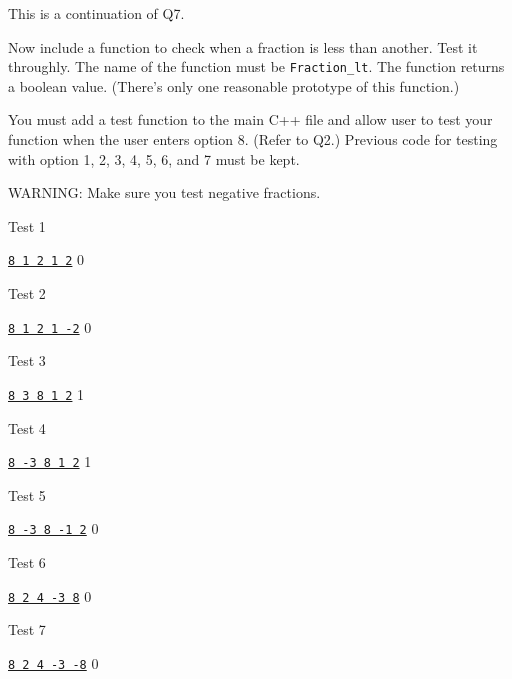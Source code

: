 This is a continuation of Q7.

Now include a function to check when a fraction is less than another.
Test it throughly.
The name of the function must be \verb!Fraction_lt!.
The function returns a boolean value.
(There's only one reasonable prototype of this function.)

You must add a test function to the main C++ file and allow user to test
your function when the user enters option 8. (Refer to Q2.)
Previous code for testing with option 1, 2, 3, 4, 5, 6, and 7 must be kept.

WARNING: Make sure you test negative fractions.

Test 1
\begin{console}[commandchars=\\\{\}]
\underline{\texttt{8 1 2 1 2}}
0
\end{console}

Test 2
\begin{console}[commandchars=\\\{\}]
\underline{\texttt{8 1 2 1 -2}}
0
\end{console}

Test 3
\begin{console}[commandchars=\\\{\}]
\underline{\texttt{8 3 8 1 2}}
1
\end{console}

Test 4
\begin{console}[commandchars=\\\{\}]
\underline{\texttt{8 -3 8 1 2}}
1
\end{console}

Test 5
\begin{console}[commandchars=\\\{\}]
\underline{\texttt{8 -3 8 -1 2}}
0
\end{console}

Test 6
\begin{console}[commandchars=\\\{\}]
\underline{\texttt{8 2 4 -3 8}}
0
\end{console}

Test 7
\begin{console}[commandchars=\\\{\}]
\underline{\texttt{8 2 4 -3 -8}}
0
\end{console}

